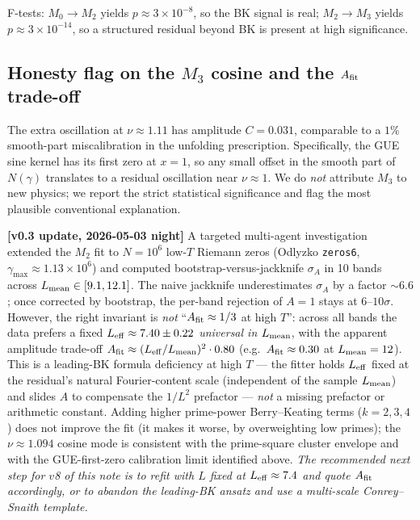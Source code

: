 \documentclass[aps,prd,superscriptaddress,nofootinbib,floatfix,10pt]{revtex4-2}
\begin{document}
F-tests: $M_{0}\!\to\! M_{2}$ yields $p\approx 3\times 10^{-8}$, so the
BK signal is real; $M_{2}\!\to\! M_{3}$ yields
$p\approx 3\times 10^{-14}$, so a structured residual beyond BK is
present at high significance.

\subsection{Honesty flag on the $M_{3}$ cosine and the $A_{\rm fit}$ trade-off}

The extra oscillation at $\nu\approx 1.11$ has amplitude
$C = 0.031$, comparable to a $1\%$ smooth-part miscalibration in the
unfolding prescription. Specifically, the GUE sine kernel has its
first zero at $x=1$, so any small offset in the smooth part of
$N(\gamma)$ translates to a residual oscillation near $\nu\approx 1$.
We do \emph{not} attribute $M_{3}$ to new physics; we report the
strict statistical significance and flag the most plausible
conventional explanation.

\textbf{[v0.3 update, 2026-05-03 night]} A targeted multi-agent investigation extended the $M_{2}$ fit to $N=10^{6}$ low-$T$ Riemann zeros (Odlyzko \texttt{zeros6}, $\gamma_{\max}\approx 1.13\times 10^{6}$) and computed bootstrap-versus-jackknife $\sigma_A$ in 10 bands across $L_{\rm mean}\in [9.1, 12.1]$. The naive jackknife underestimates $\sigma_A$ by a factor $\sim 6.6$; once corrected by bootstrap, the per-band rejection of $A=1$ stays at $6$--$10\sigma$. However, the right invariant is \emph{not} ``$A_{\rm fit}\approx 1/3$ at high $T$'': across all bands the data prefers a fixed $L_{\rm eff}\approx 7.40\pm 0.22$ \emph{universal in $L_{\rm mean}$}, with the apparent amplitude trade-off $A_{\rm fit}\approx (L_{\rm eff}/L_{\rm mean})^{2}\cdot 0.80$ (e.g.\ $A_{\rm fit}\approx 0.30$ at $L_{\rm mean}=12$). This is a leading-BK formula deficiency at high $T$ — the fitter holds $L_{\rm eff}$ fixed at the residual's natural Fourier-content scale (independent of the sample $L_{\rm mean}$) and slides $A$ to compensate the $1/L^{2}$ prefactor — \emph{not} a missing prefactor or arithmetic constant. Adding higher prime-power Berry--Keating terms ($k=2,3,4$) does not improve the fit (it makes it worse, by overweighting low primes); the $\nu\approx 1.094$ cosine mode is consistent with the prime-square cluster envelope and with the GUE-first-zero calibration limit identified above. \emph{The recommended next step for $v$8 of this note is to refit with $L$ fixed at $L_{\rm eff}\approx 7.4$ and quote $A_{\rm fit}$ accordingly, or to abandon the leading-BK ansatz and use a multi-scale Conrey--Snaith template.}
\end{document}
